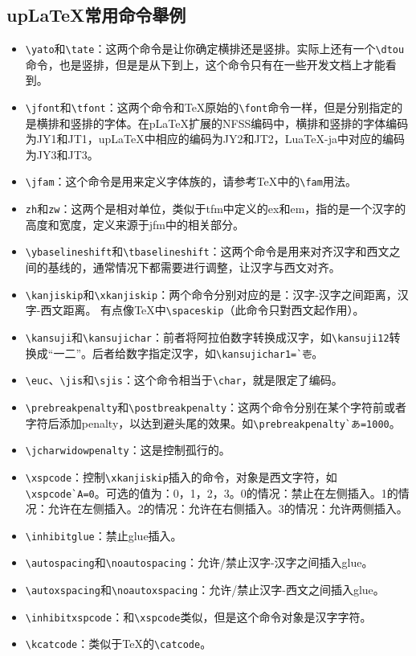 \documentclass[a4,11pt,uplatex,openleft]{jsarticle}
\DeclareRobustCommand\upstht{\kanjifamily{upstht}\selectfont}
\begin{document}
\begin{appendix}
\section{up{\LaTeX}常用命令舉例}

\begin{itemize}

\upstht

\item{}{\verb+\yato+}和{\verb+\tate+}：这两个命令是让你确定横排还是竖排。实际上还有一个{\verb+\dtou+}命令，也是竖排，但是是从下到上，这个命令只有在一些开发文档上才能看到。
\item{}{\verb+\jfont+}和{\verb+\tfont+}：这两个命令和TeX原始的{\verb+\font+}命令一样，但是分别指定的是横排和竖排的字体。在{p\LaTeX}扩展的NFSS编码中，横排和竖排的字体编码为JY1和JT1，{up\LaTeX}中相应的编码为JY2和JT2，{Lua\TeX}-ja中对应的编码为JY3和JT3。
\item{}{\verb+\jfam+}：这个命令是用来定义字体族的，请参考{\TeX}中的{\verb+\fam+}用法。
\item{}{\verb+zh+}和{\verb+zw+}：这两个是相对单位，类似于tfm中定义的ex和em，指的是一个汉字的高度和宽度，定义来源于jfm中的相关部分。
\item{}{\verb+\ybaselineshift+}和{\verb+\tbaselineshift+}：这两个命令是用来对齐汉字和西文之间的基线的，通常情况下都需要进行调整，让汉字与西文对齐。
\item{}{\verb+\kanjiskip+}和{\verb+\xkanjiskip+}：两个命令分别对应的是：汉字-汉字之间距离，汉字-西文距离。 有点像{\TeX}中{\verb+\spaceskip+}（此命令只對西文起作用）。
\item{}{\verb+\kansuji+}和{\verb+\kansujichar+}：前者将阿拉伯数字转换成汉字，如{\verb+\kansuji12+}转换成“一二”。后者给数字指定汉字，如{\verb+\kansujichar1=`壱+}。
\item{}{\verb+\euc+}、{\verb+\jis+}和{\verb+\sjis+}：这个命令相当于{\verb+\char+}，就是限定了编码。
\item{}{\verb+\prebreakpenalty+}和{\verb+\postbreakpenalty+}：这两个命令分别在某个字符前或者字符后添加penalty，以达到避头尾的效果。如{\verb+\prebreakpenalty`あ=1000+}。
\item{}{\verb+\jcharwidowpenalty+}：这是控制孤行的。
\item{}{\verb+\xspcode+}：控制{\verb+\xkanjiskip+}插入的命令，对象是西文字符，如{\verb+\xspcode`A=0+}。可选的值为：0，1，2，3。0的情况：禁止在左侧插入。1的情况：允许在左侧插入。2的情况：允许在右侧插入。3的情况：允许两侧插入。
\item{}{\verb+\inhibitglue+}：禁止glue插入。
\item{}{\verb+\autospacing+}和{\verb+\noautospacing+}：允许/禁止汉字-汉字之间插入glue。
\item{}{\verb+\autoxspacing+}和{\verb+\noautoxspacing+}：允许/禁止汉字-西文之间插入glue。
\item{}{\verb+\inhibitxspcode+}：和{\verb+\xspcode+}类似，但是这个命令对象是汉字字符。
\item{}{\verb+\kcatcode+}：类似于TeX的{\verb+\catcode+}。
\end{itemize}


\end{appendix}
\end{document}
